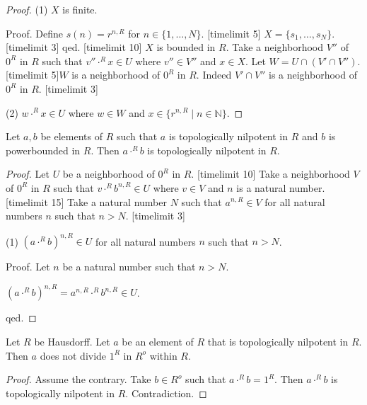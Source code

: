 \documentclass[english,11pt]{article}
\newcommand{\powers}[2]{\{{#1}^{n,#2} \mid n \in \mathbb{N}\}}
\newcommand{\Seq}[2]{\{#1,\dots,#2\}}
\newcommand{\FinSet}[3]{\{#1_{#2},\dots,#1_{#3}\}}
\begin{document}
\begin{forthel}
\begin{proof}
(1) $X$ is finite.

Proof. Define $s(n)= r^{n,R}$ for $n \in \Seq{1}{N}$.
[timelimit 5]
$X = \FinSet{s}{1}{N}$.
[timelimit 3]
qed.
[timelimit 10]
$X$ is bounded in $R$.
Take a neighborhood $V''$ of $0^{R}$ in $R$ such that
$v'' \cdot^{R} x \in U$ where $v'' \in V''$ and $x \in X$.
Let $W = U \cap (V' \cap V'')$. 
[timelimit 5]$W$ is a neighborhood
of $0^{R}$ in $R$. Indeed $V' \cap V''$ is a neighborhood
of $0^{R}$ in $R$.
[timelimit 3]

(2) $w \cdot^{R} x \in U$ where $w \in W$ and $x \in \powers{r}{R}$.
    
\end{proof}

\begin{lemma}
Let $a,b$ be elements of $R$ such that $a$ is topologically nilpotent in $R$ and
$b$ is powerbounded in $R$.
Then $a\cdot^{R} b$ is topologically nilpotent in $R$.
\end{lemma}
\begin{proof}
Let $U$ be a neighborhood of $0^{R}$ in $R$.
[timelimit 10]
Take a neighborhood $V$ of $0^{R}$ in $R$ such that
$v \cdot^{R} b^{n,R} \in U$ where $v \in V$ and $n$ is a natural number.
[timelimit 15]
Take a natural number $N$ such that
$a^{n,R} \in V$ for all natural numbers $n$ such that $n > N$.
[timelimit 3]

(1) $(a \cdot^{R} b)^{n,R} \in U$ for all natural numbers $n$ such that $n > N$.

Proof. Let $n$ be a natural number such that $n > N$.

$(a \cdot^{R} b)^{n,R} = a^{n,R} \cdot^{R} b^{n,R} \in U$. 

qed. 
\end{proof}

\begin{lemma} Let $R$ be Hausdorff.
Let $a$ be an element of $R$ that is topologically nilpotent in $R$.
Then $a$ does not divide $1^{R}$ in $R^o$ within $R$.
\end{lemma}
\begin{proof}
Assume the contrary. 
Take $b \in R^o$ such that $a \cdot^{R} b = 1^{R}$.
Then  $a \cdot^{R} b$ is topologically nilpotent in $R$.
Contradiction.
\end{proof}


\end{forthel}
\end{document}
